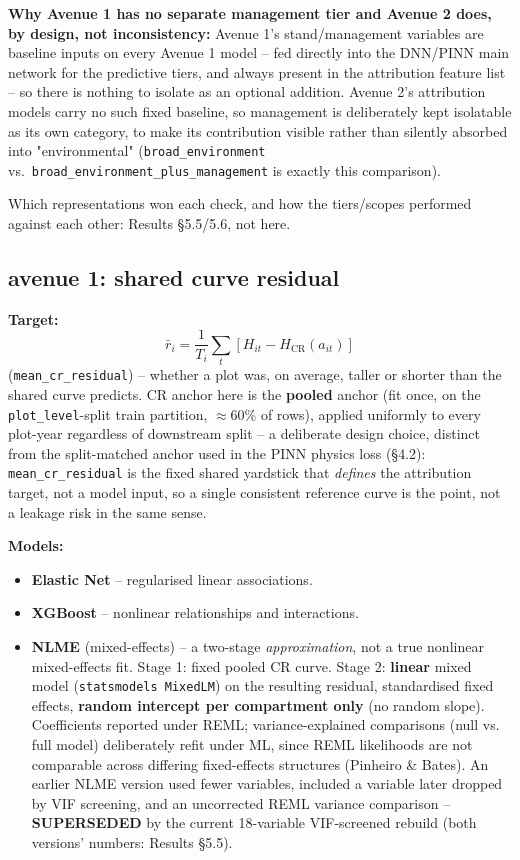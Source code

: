 \documentclass[11pt,a4paper]{report}
\begin{document}
\textbf{Why Avenue 1 has no separate management tier and Avenue 2 does, by design, not
inconsistency:} Avenue 1's stand/management variables are baseline inputs on every Avenue 1
model -- fed directly into the DNN/PINN main network for the predictive tiers, and always present
in the attribution feature list -- so there is nothing to isolate as an optional addition.
Avenue 2's attribution models carry no such fixed baseline, so management is deliberately kept
isolatable as its own category, to make its contribution visible rather than silently absorbed
into "environmental" (\texttt{broad\_environment} vs.\ \texttt{broad\_environment\_plus\_management}
is exactly this comparison).

Which representations won each check, and how the tiers/scopes performed against each other:
Results \S5.5/5.6, not here.

\subsection{avenue 1: shared curve residual}

\textbf{Target:}
\[
\bar r_i = \frac{1}{T_i}\sum_t \left[H_{it} - H_{\text{CR}}(a_{it})\right]
\]
(\texttt{mean\_cr\_residual}) -- whether a plot was, on average, taller or shorter than the shared
curve predicts. CR anchor here is the \textbf{pooled} anchor (fit once, on the
\texttt{plot\_level}-split train partition, $\approx$60\% of rows), applied uniformly to every
plot-year regardless of downstream split -- a deliberate design choice, distinct from the
split-matched anchor used in the PINN physics loss (\S4.2): \texttt{mean\_cr\_residual} is the
fixed shared yardstick that \emph{defines} the attribution target, not a model input, so a single
consistent reference curve is the point, not a leakage risk in the same sense.

\textbf{Models:}
\begin{itemize}
\setlength\itemsep{0pt}
\item \textbf{Elastic Net} -- regularised linear associations.
\item \textbf{XGBoost} -- nonlinear relationships and interactions.
\item \textbf{NLME} (mixed-effects) -- a two-stage \emph{approximation}, not a true nonlinear
mixed-effects fit. Stage 1: fixed pooled CR curve. Stage 2: \textbf{linear} mixed model
(\texttt{statsmodels MixedLM}) on the resulting residual, standardised fixed effects,
\textbf{random intercept per compartment only} (no random slope). Coefficients reported under
REML; variance-explained comparisons (null vs. full model) deliberately refit under ML, since REML
likelihoods are not comparable across differing fixed-effects structures (Pinheiro \& Bates). An
earlier NLME version used fewer variables, included a variable later dropped by VIF screening, and
an uncorrected REML variance comparison -- \textbf{SUPERSEDED} by the current 18-variable
VIF-screened rebuild (both versions' numbers: Results \S5.5).
\end{itemize}
\end{document}
